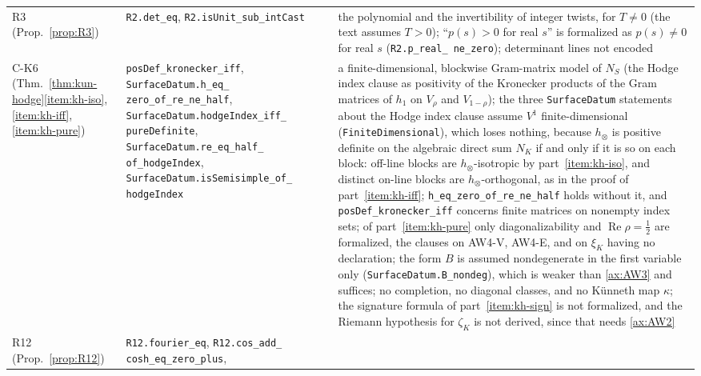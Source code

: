\documentclass[11pt]{amsart}
\theoremstyle{plain}
\theoremstyle{definition}
\theoremstyle{remark}
\numberwithin{equation}{section}
\DeclareMathOperator{\Rea}{Re}
\renewcommand{\Re}{\Rea}
\begin{document}
{\begin{longtable}{@{}>{\raggedright\arraybackslash}p{}
>{\raggedright\arraybackslash}p{}
>{\raggedright\arraybackslash}p{}@{}}
R3 (Prop.~\ref{prop:R3}) & \texttt{R2.\allowbreak{}det\_\allowbreak{}eq},
\texttt{R2.\allowbreak{}isUnit\_\allowbreak{}sub\_\allowbreak{}intCast} &
the polynomial and the invertibility of integer twists, for $T\ne0$
(the text assumes $T>0$); ``$p(s)>0$ for real $s$'' is formalized as
$p(s)\ne0$ for real $s$ (\texttt{R2.\allowbreak{}p\_\allowbreak{}real\_%
\allowbreak{}ne\_\allowbreak{}zero}); determinant lines not encoded\\
C-K6 (Thm.~\ref{thm:kun-hodge}\ref{item:kh-iso}, \ref{item:kh-iff},
\ref{item:kh-pure}) &
\texttt{posDef\_\allowbreak{}kronecker\_\allowbreak{}iff},
\texttt{SurfaceDatum.\allowbreak{}h\_\allowbreak{}eq\_\allowbreak{}%
zero\_\allowbreak{}of\_\allowbreak{}re\_\allowbreak{}ne\_\allowbreak{}half},
\texttt{SurfaceDatum.\allowbreak{}hodgeIndex\_\allowbreak{}iff\_\allowbreak{}%
pureDefinite},
\texttt{SurfaceDatum.\allowbreak{}re\_\allowbreak{}eq\_\allowbreak{}half\_%
\allowbreak{}of\_\allowbreak{}hodgeIndex},
\texttt{SurfaceDatum.\allowbreak{}isSemisimple\_\allowbreak{}of\_%
\allowbreak{}hodgeIndex} &
a finite-dimensional, blockwise Gram-matrix model of $N_S$ (the Hodge
index clause as positivity of the Kronecker products of the Gram
matrices of $h_1$ on $V_\rho$ and $V_{1-\rho}$); the three
\texttt{SurfaceDatum} statements about the Hodge index clause assume
$V^1$ finite-dimensional (\texttt{FiniteDimensional}), which loses
nothing, because $h_\otimes$ is positive definite on the algebraic
direct sum $N_K$ if and only if it is so on each block: off-line
blocks are $h_\otimes$-isotropic by part~\ref{item:kh-iso}, and
distinct on-line blocks are $h_\otimes$-orthogonal, as in the proof of
part~\ref{item:kh-iff}; \texttt{h\_eq\_zero\_of\_re\_ne\_half} holds
without it, and \texttt{posDef\_kronecker\_iff} concerns finite
matrices on nonempty index sets; of part~\ref{item:kh-pure} only
diagonalizability and $\Re\rho=\tfrac12$ are formalized, the clauses on
AW4-V, AW4-E, and on $\xi_K$ having no declaration; the form $B$
is assumed nondegenerate in the
first variable only (\texttt{SurfaceDatum.\allowbreak{}B\_nondeg}),
which is weaker than \ref{ax:AW3} and suffices; no completion, no
diagonal classes, and no K\"unneth map $\kappa$; the signature formula
of part~\ref{item:kh-sign} is not formalized, and the Riemann
hypothesis for $\zeta_K$ is not derived, since that needs
\ref{ax:AW2}\\
R12 (Prop.~\ref{prop:R12}) & \texttt{R12.\allowbreak{}fourier\_\allowbreak{}eq},
\texttt{R12.\allowbreak{}cos\_\allowbreak{}add\_\allowbreak{}%
cosh\_\allowbreak{}eq\_\allowbreak{}zero\_\allowbreak{}plus},

\end{longtable}}
\end{document}

